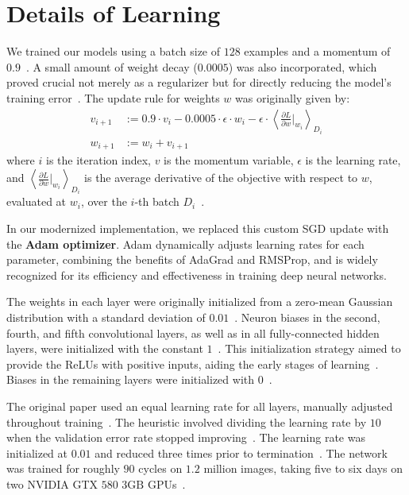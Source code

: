 \documentclass{article}
\begin{document}
\section{Details of Learning}
\noindent
We trained our models using a batch size of $128$ examples and a momentum of $0.9$~\cite{krizhevsky2012imagenet}. A small amount of weight decay ($0.0005$) was also incorporated, which proved crucial not merely as a regularizer but for directly reducing the model's training error~\cite{krizhevsky2012imagenet}. The update rule for weights $w$ was originally given by:
\begin{align*}
v_{i+1} &:= 0.9 \cdot v_i - 0.0005 \cdot \epsilon \cdot w_i - \epsilon \cdot \left\langle \frac{\partial L}{\partial w} \bigg|_{w_i} \right\rangle_{D_i} \\
w_{i+1} &:= w_i + v_{i+1}
\end{align*}
where $i$ is the iteration index, $v$ is the momentum variable, $\epsilon$ is the learning rate, and
$\left\langle \frac{\partial L}{\partial w} \bigg|_{w_i} \right\rangle_{D_i}$
is the average derivative of the objective with respect to $w$, evaluated at $w_i$, over the $i$-th batch $D_i$~\cite{krizhevsky2012imagenet}.

In our modernized implementation, we replaced this custom SGD update with the \textbf{Adam optimizer}. Adam dynamically adjusts learning rates for each parameter, combining the benefits of AdaGrad and RMSProp, and is widely recognized for its efficiency and effectiveness in training deep neural networks.

The weights in each layer were originally initialized from a zero-mean Gaussian distribution with a standard deviation of $0.01$~\cite{krizhevsky2012imagenet}. Neuron biases in the second, fourth, and fifth convolutional layers, as well as in all fully-connected hidden layers, were initialized with the constant $1$~\cite{krizhevsky2012imagenet}. This initialization strategy aimed to provide the ReLUs with positive inputs, aiding the early stages of learning~\cite{krizhevsky2012imagenet}. Biases in the remaining layers were initialized with $0$~\cite{krizhevsky2012imagenet}.

The original paper used an equal learning rate for all layers, manually adjusted throughout training~\cite{krizhevsky2012imagenet}. The heuristic involved dividing the learning rate by $10$ when the validation error rate stopped improving~\cite{krizhevsky2012imagenet}. The learning rate was initialized at $0.01$ and reduced three times prior to termination~\cite{krizhevsky2012imagenet}. The network was trained for roughly $90$ cycles on $1.2$ million images, taking five to six days on two NVIDIA GTX $580$ $3\text{GB}$ GPUs~\cite{krizhevsky2012imagenet}.
\end{document}
